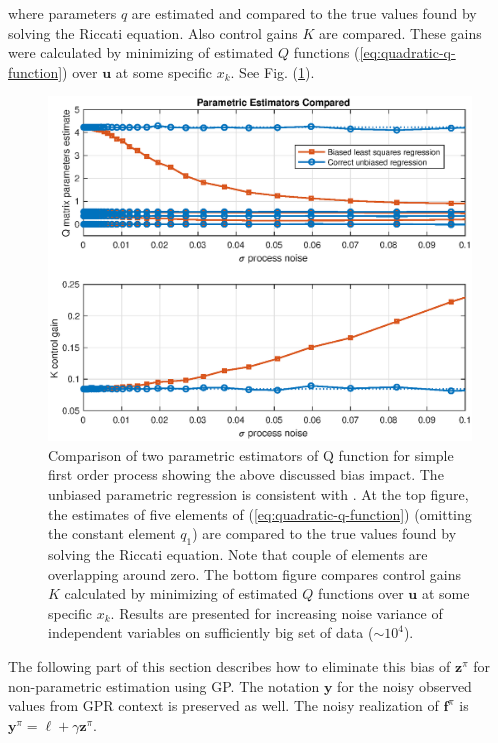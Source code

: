 \documentclass{ifacconf}
\begin{document}
where parameters $q$ are estimated and compared to the true values found by solving the Riccati equation. Also control gains $K$ are compared. These gains were calculated by minimizing of estimated $Q$ functions (\ref{eq:quadratic-q-function}) over $\mathbf{u}$ at some specific $x_k$. See Fig. (\ref{fig:Biased-vs-unbiased}). 

\begin{figure}
\centering{}\includegraphics[width=0.95\columnwidth]{figures/biased_vs_unbiased}
\caption{\label{fig:Biased-vs-unbiased} Comparison of two parametric estimators of Q function for simple first order process showing the above discussed bias impact. The unbiased parametric regression is consistent with \citep{ecc19ref:Bratke_Linear_Least_Squares_Algo}. At the top figure, the estimates of five elements of (\ref{eq:quadratic-q-function}) (omitting the constant element $q_{1}$) are compared to the true values found by solving the Riccati equation. Note that couple of elements are overlapping around zero. The bottom figure compares control gains $K$ calculated by minimizing of estimated $Q$ functions over $\mathbf{u}$ at some specific $x_k$. Results are presented for increasing noise variance of independent variables on sufficiently big set of data ($\sim10^{4}$).}
\end{figure}

The following part of this section describes how to eliminate this bias of $\mathbf{z}^{\pi}$ for non-parametric estimation using GP. The notation $\mathbf{y}$ for the noisy observed values from GPR context is preserved as well. The noisy realization of $\mathbf{f}^{\pi}$ is $\mathbf{y}^{\pi}=\mathbf{\boldsymbol{\ell}}+\gamma\mathbf{z}^{\pi}$.
\end{document}
